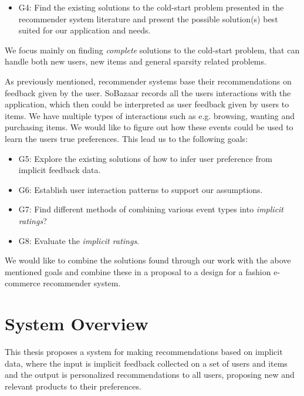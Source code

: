 \begin{itemize}
  \item G4: Find the existing solutions to the cold-start problem presented in the recommender system literature
  		and present the possible solution(s) best suited for our application and needs.
\end{itemize}

We focus mainly on finding \emph{complete} solutions to the cold-start problem, that can handle both new users, new items
and general sparsity related problems.

As previously mentioned, recommender systems base their recommendations on feedback given by the user. SoBazaar records
all the users interactions with the application, which then could be interpreted as user feedback given by users to items.
We have multiple types of interactions such as e.g. browsing, wanting and purchasing items. We would like to figure out
how these events could be used to learn the users true preferences. This lead us to the following goals:


\begin{itemize}
 	\item G5: Explore the existing solutions of how to infer user preference from implicit feedback data.
 	\item G6: Establish user interaction patterns to support our assumptions.
	\item G7: Find different methods of combining various event types into \emph{implicit ratings}?
  	\item G8: Evaluate the \emph{implicit ratings}.
\end{itemize}

We would like to combine the solutions found through our work with the above mentioned goals and combine these in a
proposal to a design for a fashion e-commerce recommender system.

\section{System Overview}

  
  This thesis proposes a system for making recommendations based on implicit
  data, where the input is implicit feedback collected on a set of users and
  items and the output is personalized recommendations to all users, proposing
  new and relevant products to their preferences.
 
